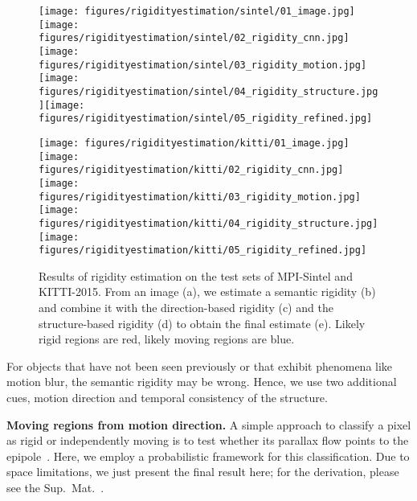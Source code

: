 \documentclass[10pt,twocolumn,letterpaper]{article}
\begin{document}
\newcommand{\rigidwidth}{0.2\textwidth}
\begin{figure*}[t]
\centerline{
	\texttt{[image: figures/rigidityestimation/sintel/01\_image.jpg]}\texttt{[image: figures/rigidityestimation/sintel/02\_rigidity\_cnn.jpg]}\texttt{[image: figures/rigidityestimation/sintel/03\_rigidity\_motion.jpg]}\texttt{[image: figures/rigidityestimation/sintel/04\_rigidity\_structure.jpg]}\texttt{[image: figures/rigidityestimation/sintel/05\_rigidity\_refined.jpg]}}
\centerline{
	\texttt{[image: figures/rigidityestimation/kitti/01\_image.jpg]}\texttt{[image: figures/rigidityestimation/kitti/02\_rigidity\_cnn.jpg]}\texttt{[image: figures/rigidityestimation/kitti/03\_rigidity\_motion.jpg]}\texttt{[image: figures/rigidityestimation/kitti/04\_rigidity\_structure.jpg]}\texttt{[image: figures/rigidityestimation/kitti/05\_rigidity\_refined.jpg]}}
\vspace{-0.07in}
\caption{Results of rigidity estimation on the test sets of MPI-Sintel and KITTI-2015. From an image (a), we estimate a semantic rigidity (b) and combine it with the direction-based rigidity (c) and the structure-based rigidity (d) to obtain the final estimate (e). Likely rigid regions are red, likely moving regions are blue.}
\label{fig:rigidity}
\end{figure*}
\noindent
For objects that have not been seen previously or that exhibit
phenomena like motion blur, the semantic rigidity may be wrong. 
Hence, we use two additional cues, motion direction and temporal consistency of the structure.

\noindent
{\bf Moving regions from motion direction.}
A simple approach to classify a pixel as rigid or independently moving is to test whether its parallax flow points to the epipole~\cite{Irani:1998:MovingObjectDetection}.
Here, we employ a probabilistic framework for this classification.
Due to space limitations, we just present the final result here; for the derivation, please see the Sup.~Mat.~\cite{MRFlow:Website}.
\end{document}
